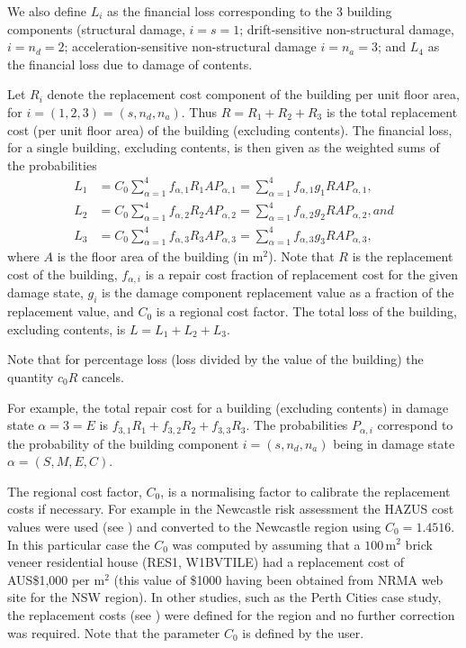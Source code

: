 We also define $L_i$ as the financial loss corresponding to the 3
building components (structural damage, $i=s=1$; drift-sensitive
non-structural damage, $i=n_d=2$; acceleration-sensitive
non-structural damage $i=n_a=3$; and $L_4$ as the financial loss
due to damage of contents.


Let $R_i$ denote the replacement cost component of the building
per unit floor area, for $i=(1,2,3)=(s,n_d,n_a)$. Thus
$R=R_1+R_2+R_3$ is the total replacement cost (per unit floor
area) of the building (excluding contents). The financial loss,
for a single building, excluding contents, is then given as the
weighted sums of the probabilities
\begin{align*}
\label{eq:this-loss}
 L_1 &= C_0\sum_{\alpha=1}^4
   f_{\alpha, 1} R_1 A P_{\alpha, 1} =
   \sum_{\alpha=1}^4 f_{\alpha, 1} g_1R A P_{\alpha, 1},\\
L_2 &= C_0 \sum_{\alpha=1}^4
   f_{\alpha, 2} R_2 A P_{\alpha, 2} =
   \sum_{\alpha=1}^4 f_{\alpha, 2} g_2R A P_{\alpha, 2}, and\\
L_3 &= C_0 \sum_{\alpha=1}^4
   f_{\alpha, 3} R_3 A P_{\alpha, 3} =
    \sum_{\alpha=1}^4 f_{\alpha, 3} g_3R A P_{\alpha, 3},
\end{align*}
where $A$ is the floor area of the building (in $\mathrm{m}^2$).
Note that $R$ is the replacement cost of the building, $f_{\alpha,
i}$ is a repair cost fraction of replacement cost for the given
damage state, $g_i$ is the damage component replacement value as a
fraction of the replacement value, and $C_0$ is a regional cost
factor. The total loss of the
building, excluding contents, is $L=L_1+L_2+L_3$.

Note that for percentage loss (loss divided by the value of the
building) the quantity $c_0R$ cancels.


For example, the total repair cost for a building (excluding contents)
in damage
state $\alpha=3=E$ is $f_{3,1}R_1+f_{3,2}R_2+f_{3,3}R_3$.
The probabilities $P_{\alpha, i}$ correspond to the probability
of the building component $i=(s, n_d, n_a)$ being in damage state
$\alpha=(S,M,E,C)$.

The regional cost factor, $C_0$, is a
normalising factor to calibrate the replacement costs if
necessary. For example in the Newcastle risk assessment
\citep{dr_Fulford02a} the HAZUS cost values were used (see
) and converted to the Newcastle region
using $C_0= 1.4516$. In this particular case the $C_0$ was
computed by assuming that a $100\,\mathrm{m^2}$ brick veneer
residential house (RES1, W1BVTILE) had a replacement cost of
AUS\$1,000 per $\mathrm{m}^2$ (this value of \$1000 having been
obtained from NRMA web site for the NSW region). In other studies,
such as the Perth Cities case study, the replacement costs (see
) were defined for the region and
no further correction was required. Note that the parameter $C_0$
is defined by the user.

